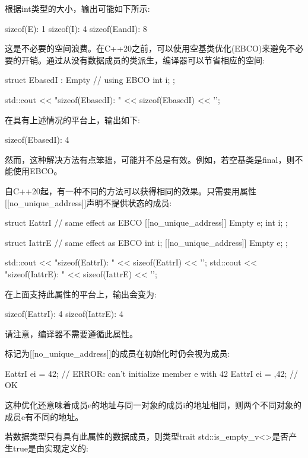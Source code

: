 根据int类型的大小，输出可能如下所示:

\begin{shell}
sizeof(E):     1
sizeof(I):     4
sizeof(EandI): 8
\end{shell}

这是不必要的空间浪费。在C++20之前，可以使用空基类优化(EBCO)来避免不必要的开销。通过从没有数据成员的类派生，编译器可以节省相应的空间:

\begin{cpp}
struct EbasedI : Empty { // using EBCO
	int i;
};

std::cout << "sizeof(EbasedI): " << sizeof(EbasedI) << '\n';
\end{cpp}

在具有上述情况的平台上，输出如下:

\begin{shell}
sizeof(EbasedI): 4
\end{shell}

然而，这种解决方法有点笨拙，可能并不总是有效。例如，若空基类是final，则不能使用EBCO。

自C++20起，有一种不同的方法可以获得相同的效果。只需要用属性[[no\_unique\_address]]声明不提供状态的成员:

\begin{cpp}
struct EattrI { // same effect as EBCO
	[[no_unique_address]] Empty e;
	int i;
};

struct IattrE { // same effect as EBCO
	int i;
	[[no_unique_address]] Empty e;
};

std::cout << "sizeof(EattrI): " << sizeof(EattrI) << '\n';
std::cout << "sizeof(IattrE): " << sizeof(IattrE) << '\n';
\end{cpp}

在上面支持此属性的平台上，输出会变为:

\begin{shell}
sizeof(EattrI): 4
sizeof(IattrE): 4
\end{shell}

请注意，编译器不需要遵循此属性。

标记为[[no\_unique\_address]]的成员在初始化时仍会视为成员:

\begin{cpp}
EattrI ei = {42}; // ERROR: can’t initialize member e with 42
EattrI ei = {{},42}; // OK
\end{cpp}

这种优化还意味着成员e的地址与同一对象的成员i的地址相同，则两个不同对象的成员e有不同的地址。

若数据类型只有具有此属性的数据成员，则类型trait std::is\_empty\_v<>是否产生true是由实现定义的:


